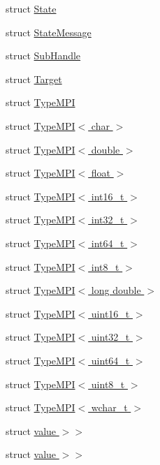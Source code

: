 \begin{DoxyCompactItemize}
\item 
struct \hyperlink{structvt_1_1rdma_1_1_state}{State}
\item 
struct \hyperlink{structvt_1_1rdma_1_1_state_message}{State\+Message}
\item 
struct \hyperlink{structvt_1_1rdma_1_1_sub_handle}{Sub\+Handle}
\item 
struct \hyperlink{structvt_1_1rdma_1_1_target}{Target}
\item 
struct \hyperlink{structvt_1_1rdma_1_1_type_m_p_i}{Type\+M\+PI}
\item 
struct \hyperlink{structvt_1_1rdma_1_1_type_m_p_i_3_01char_01_4}{Type\+M\+P\+I$<$ char $>$}
\item 
struct \hyperlink{structvt_1_1rdma_1_1_type_m_p_i_3_01double_01_4}{Type\+M\+P\+I$<$ double $>$}
\item 
struct \hyperlink{structvt_1_1rdma_1_1_type_m_p_i_3_01float_01_4}{Type\+M\+P\+I$<$ float $>$}
\item 
struct \hyperlink{structvt_1_1rdma_1_1_type_m_p_i_3_01int16__t_01_4}{Type\+M\+P\+I$<$ int16\+\_\+t $>$}
\item 
struct \hyperlink{structvt_1_1rdma_1_1_type_m_p_i_3_01int32__t_01_4}{Type\+M\+P\+I$<$ int32\+\_\+t $>$}
\item 
struct \hyperlink{structvt_1_1rdma_1_1_type_m_p_i_3_01int64__t_01_4}{Type\+M\+P\+I$<$ int64\+\_\+t $>$}
\item 
struct \hyperlink{structvt_1_1rdma_1_1_type_m_p_i_3_01int8__t_01_4}{Type\+M\+P\+I$<$ int8\+\_\+t $>$}
\item 
struct \hyperlink{structvt_1_1rdma_1_1_type_m_p_i_3_01long_01double_01_4}{Type\+M\+P\+I$<$ long double $>$}
\item 
struct \hyperlink{structvt_1_1rdma_1_1_type_m_p_i_3_01uint16__t_01_4}{Type\+M\+P\+I$<$ uint16\+\_\+t $>$}
\item 
struct \hyperlink{structvt_1_1rdma_1_1_type_m_p_i_3_01uint32__t_01_4}{Type\+M\+P\+I$<$ uint32\+\_\+t $>$}
\item 
struct \hyperlink{structvt_1_1rdma_1_1_type_m_p_i_3_01uint64__t_01_4}{Type\+M\+P\+I$<$ uint64\+\_\+t $>$}
\item 
struct \hyperlink{structvt_1_1rdma_1_1_type_m_p_i_3_01uint8__t_01_4}{Type\+M\+P\+I$<$ uint8\+\_\+t $>$}
\item 
struct \hyperlink{structvt_1_1rdma_1_1_type_m_p_i_3_01wchar__t_01_4}{Type\+M\+P\+I$<$ wchar\+\_\+t $>$}
\item 
struct \hyperlink{structvt_1_1rdma_1_1_handle_3_01_t_00_01_e_00_01_index_t_00_01typename_01std_1_1enable__if__t_3_f66c3940d9f3649c3a5c3e77d63c658a}{value $>$$>$}
\item 
struct \hyperlink{structvt_1_1rdma_1_1_handle_3_01_t_00_01_e_00_01_index_t_00_01typename_01std_1_1enable__if__t_3_d15dac1b5db6e2bc0fb0b8aca42b1456}{value $>$$>$}
\end{DoxyCompactItemize}
